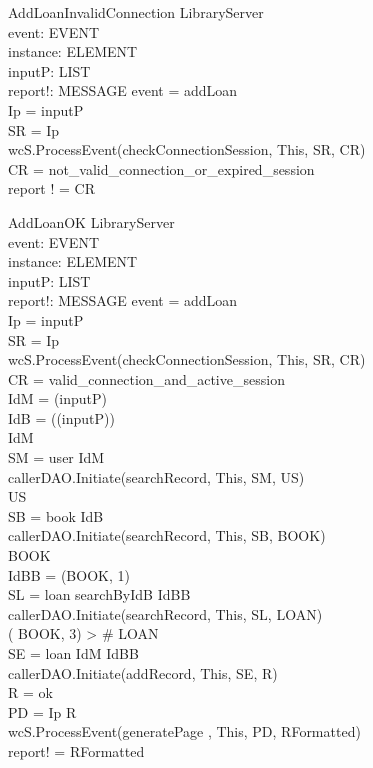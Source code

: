 \begin{schema}{AddLoanInvalidConnection}
\Xi LibraryServer \\
event: EVENT \\
instance: ELEMENT \\
inputP: LIST \\
report!: MESSAGE
\where event = addLoan \\
Ip = \head inputP \\
SR = \lseq Ip \rseq \\ 
wcS.ProcessEvent(checkConnectionSession, This, SR, CR) \\
CR = not\_valid\_connection\_or\_expired\_session \\ 
report ! = CR
\end{schema}

\begin{schema}{AddLoanOK}
\Delta LibraryServer \\
event: EVENT \\
instance: ELEMENT \\
inputP: LIST \\
report!: MESSAGE
\where event = addLoan \\
Ip = \head inputP \\
SR = \lseq Ip \rseq \\ 
wcS.ProcessEvent(checkConnectionSession, This, SR, CR) \\
CR = valid\_connection\_and\_active\_session \\
IdM = \head (\tail inputP) \\
IdB = \head (\tail (\tail inputP)) \\
IdM  \\
SM = \lseq user IdM \rseq \\
callerDAO.Initiate(searchRecord, This, SM, US) \\
US \neq \emptyset \\
SB = \lseq book IdB \rseq \\
callerDAO.Initiate(searchRecord, This, SB, BOOK) \\
BOOK \neq \emptyset \\
IdBB = \nth (\head BOOK, 1) \\
SL = \lseq loan searchByIdB IdBB \rseq \\
callerDAO.Initiate(searchRecord, This, SL, LOAN) \\
\nth( \head BOOK, 3) > \# LOAN \\
SE = \lseq loan IdM IdBB \rseq \\
callerDAO.Initiate(addRecord, This, SE, R) \\
R = ok \\
PD = \lseq Ip R \rseq \\
wcS.ProcessEvent(generatePage , This, PD, RFormatted) \\
report! = RFormatted 
\end{schema}

